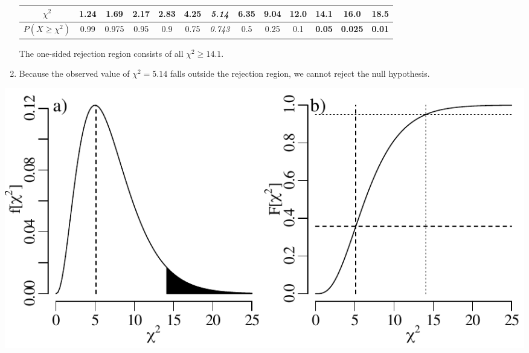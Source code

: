 \begin{enumerate}
  \begin{center}
    \begin{tabular}{c|c@{\gap}c@{\gap}c@{\gap}c@{\gap}
        c@{\gap}c@{\gap}c@{\gap}c@{\gap}c@{\gap}c@{\gap}c@{\gap}c}
      $\chi^2$ & 1.24 & 1.69 & 2.17 & 2.83 & 4.25 & \textit{5.14} &
      6.35 & 9.04 & 12.0 & \textbf{14.1} & \textbf{16.0} & \textbf{18.5} \\ \hline
      $P(X\geq{\chi^2})$ & 0.99 & 0.975 & 0.95 & 0.9 & 0.75 &
      \textit{0.743} & 0.5 & 0.25 & 0.1 & \textbf{0.05} &
      \textbf{0.025} & \textbf{0.01}
    \end{tabular}
  \end{center}

  The one-sided rejection region consists of all $\chi^2\geq{14.1}$. 

\item Because the observed value of $\chi^2=5.14$ falls outside the
  rejection region, we cannot reject the null hypothesis.

\end{enumerate}

\noindent\begin{minipage}[t][][b]{.6\textwidth}
  \includegraphics[width=\textwidth]{../figures/chi2.pdf}\\
\end{minipage}
\begin{minipage}[t][][t]{.4\textwidth}
  \label{fig:chi2}
\end{minipage}

